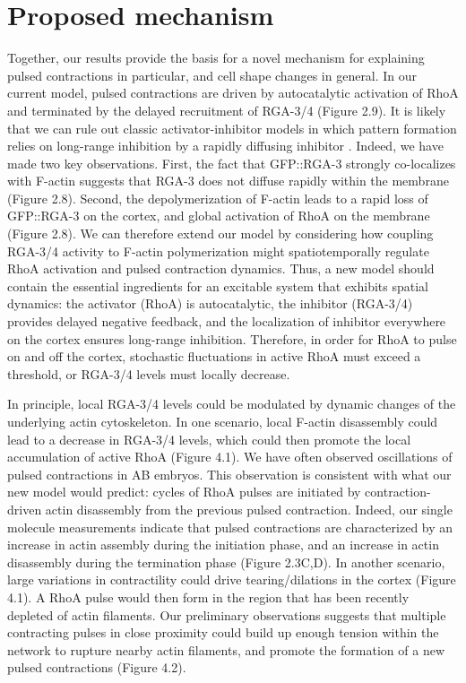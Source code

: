 \documentclass{ucetd}
\begin{document}
\section{Proposed mechanism} 
Together, our results provide the basis for a novel mechanism for explaining pulsed contractions in particular, and cell shape changes in general.  In our current model, pulsed contractions are driven by autocatalytic activation of RhoA and terminated by the delayed recruitment of RGA-3/4 (Figure 2.9).  It is likely that we can rule out classic activator-inhibitor models in which pattern formation relies on long-range inhibition by a rapidly diffusing inhibitor \cite{Gierer:1972vq}.  Indeed, we have made two key observations.  First, the fact that GFP::RGA-3 strongly co-localizes with F-actin suggests that RGA-3 does not diffuse rapidly within the membrane (Figure 2.8).  Second, the depolymerization of F-actin leads to a rapid loss of GFP::RGA-3 on the cortex, and global activation of RhoA on the membrane (Figure 2.8).  We can therefore extend our model by considering how coupling RGA-3/4 activity to F-actin polymerization might spatiotemporally regulate RhoA activation and pulsed contraction dynamics.  Thus, a new model should contain the essential ingredients for an excitable system that exhibits spatial dynamics: the activator (RhoA) is autocatalytic, the inhibitor (RGA-3/4) provides delayed negative feedback, and the localization of inhibitor everywhere on the cortex ensures long-range inhibition.  Therefore, in order for RhoA to pulse on and off the cortex, stochastic fluctuations in active RhoA must exceed a threshold, or RGA-3/4 levels must locally decrease.  


In principle, local RGA-3/4 levels could be modulated by dynamic changes of the underlying actin cytoskeleton.  In one scenario, local F-actin disassembly could lead to a decrease in RGA-3/4 levels, which could then promote the local accumulation of active RhoA (Figure 4.1).  We have often observed oscillations of pulsed contractions in AB embryos.  This observation is consistent with what our new model would predict: cycles of RhoA pulses are initiated by contraction-driven actin disassembly from the previous pulsed contraction.  Indeed, our single molecule measurements indicate that pulsed contractions are characterized by an increase in actin assembly during the initiation phase, and an increase in actin disassembly during the termination phase (Figure 2.3C,D).  In another scenario, large variations in contractility could drive tearing/dilations in the cortex (Figure 4.1).  A RhoA pulse would then form in the region that has been recently depleted of actin filaments.  Our preliminary observations suggests that multiple contracting pulses in close proximity could build up enough tension within the network to rupture nearby actin filaments, and promote the formation of a new pulsed contractions (Figure 4.2).  
\end{document}
